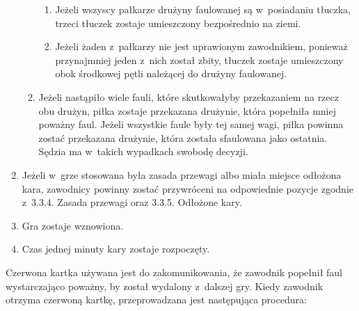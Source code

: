 \documentclass[12pt,a4paper]{article}
\renewcommand{\paragraph}[1]{
  \oldparagraph{#1}%
  \leftskip2cm
}
\begin{document}
\begin{enumerate}
\begin{enumerate}
		            \begin{enumerate}
			            \item
			                  Jeżeli wszyscy pałkarze drużyny faulowanej są w~posiadaniu
			                  tłuczka, trzeci tłuczek zostaje umieszczony bezpośrednio na ziemi.
			            \item
			                  Jeżeli żaden z~pałkarzy nie jest uprawionym zawodnikiem, ponieważ
			                  przynajmniej jeden z~nich został zbity, tłuczek zostaje
			                  umieszczony obok środkowej pętli należącej do drużyny faulowanej.
		            \end{enumerate}
		      \item
		            Jeżeli nastąpiło wiele fauli, które skutkowałyby przekazaniem na
		            rzecz obu drużyn, piłka zostaje przekazana drużynie, która popełniła
		            mniej poważny faul. Jeżeli wszystkie faule były tej samej wagi,
		            piłka powinna zostać przekazana drużynie, która została sfaulowana
		            jako ostatnia. Sędzia ma w~takich wypadkach swobodę decyzji.
	      \end{enumerate}
	\item
	      Jeżeli w~grze stosowana była zasada przewagi albo miała miejsce
	      odłożona kara, zawodnicy powinny zostać przywróceni na odpowiednie
	      pozycje zgodnie z~3.3.4. Zasada przewagi oraz 3.3.5. Odłożone kary.
	\item
	      Gra zostaje wznowiona.
	\item
	      Czas jednej minuty kary zostaje rozpoczęty.
\end{enumerate}

\paragraph{Czerwona kartka}
Czerwona kartka używana jest do
zakomunikowania, że zawodnik popełnił faul wystarczająco poważny, by
został wydalony z~dalszej gry. Kiedy zawodnik otrzyma czerwoną kartkę,
przeprowadzana jest następująca procedura:
\end{document}
